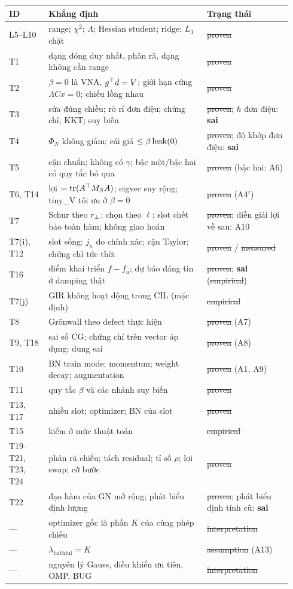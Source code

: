 \begin{longtable}{@{}p{0.13\linewidth}p{0.52\linewidth}p{0.29\linewidth}@{}}
\toprule
ID & Khẳng định & Trạng thái \\
\midrule
\endhead
L5--L10 & range; $\chi^2$; $\Lambda$; Hessian student; ridge; $L_3$ chặt & \st{proven} \\
T1 & dạng đóng duy nhất, phân rã, dạng không cần range & \st{proven} \\
T2 & $\beta=0$ là VNA, $g^{\top} d=V$; giới hạn cứng $\Lambda Cx=0$; chiếu lồng nhau & \st{proven} \\
T3 & sửa đúng chiều; rò rỉ đơn điệu; chứng chỉ; KKT; suy biến & \st{proven}; $h$ đơn điệu: \textbf{sai} \\
T4 & $\Phi_N$ không giảm; cái giá $\le\beta\operatorname{leak}(0)$ & \st{proven}; độ khớp đơn điệu: \textbf{sai} \\
T5 & cận chuẩn; không có $\gamma$; bậc một/bậc hai có quy tắc bỏ qua & \st{proven} (bậc hai: A6) \\
T6, T14 & lợi $=\operatorname{tr}(A^{\top} M_SA)$; eigvec suy rộng; tiny\_V tối ưu ở $\beta=0$ & \st{proven} (A4$'$) \\
T7 & Schur theo $r_{\perp}$; chọn theo $\ell$; slot chết bảo toàn hàm; không giao hoán & \st{proven}; diễn giải lợi về sau: A10 \\
T7(i), T12 & slot sống: $j_u$ đo chính xác; cận Taylor; chứng chỉ tức thời & \st{proven} / \st{measured} \\
T16 & điểm khai triển $f-f_u$; dự báo đáng tin ở damping thật & \st{proven}; \textbf{sai} (\st{empirical}) \\
T7(j) & GIR không hoạt động trong CIL (mặc định) & \st{empirical} \\
T8 & Grönwall theo defect thực hiện & \st{proven} (A7) \\
T9, T18 & sai số CG; chứng chỉ trên vector áp dụng; dung sai & \st{proven} (A8) \\
T10 & BN train mode; momentum; weight decay; augmentation & \st{proven} (A1, A9) \\
T11 & quy tắc $\beta$ và các nhánh suy biến & \st{proven} \\
T13, T17 & nhiều slot; optimizer; BN của slot & \st{proven} \\
T15 & kiểm ở mức thuật toán & \st{empirical} \\
T19--T21, T23, T24 & phân rã chiếu; tách residual; tỉ số $\rho$; lợi swap; cỡ bước & \st{proven} \\
T22 & đạo hàm của GN mở rộng; phát biểu định lượng & \st{proven}; phát biểu định tính cũ: \textbf{sai} \\
--- & optimizer gốc là phần $K$ của cùng phép chiếu & \st{interpretation} \\
--- & $\lambda_{\mathrm{faithful}}=K$ & \st{assumption} (A13) \\
--- & nguyên lý Gauss, điều khiển ưu tiên, OMP, BUG & \st{interpretation} \\
\bottomrule
\end{longtable}
